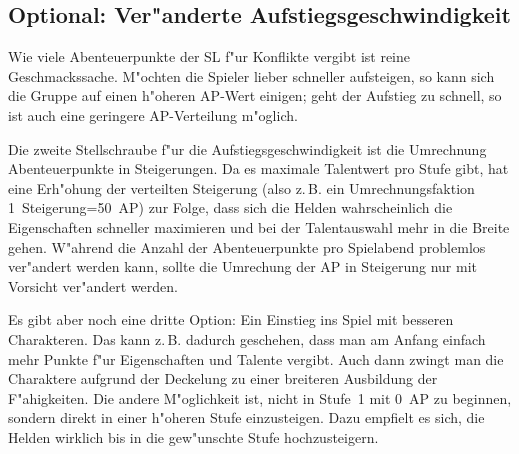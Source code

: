 \begin{optional}
\section{Optional: Ver"anderte Aufstiegsgeschwindigkeit}

Wie viele Abenteuerpunkte der SL f"ur Konflikte vergibt ist reine Geschmackssache. M"ochten die Spieler lieber schneller aufsteigen, so kann sich die Gruppe auf einen h"oheren AP-Wert einigen; geht der Aufstieg zu schnell, so ist auch eine geringere AP-Verteilung m"oglich.

Die zweite Stellschraube f"ur die Aufstiegsgeschwindigkeit ist die Umrechnung Abenteuerpunkte in Steigerungen. Da es maximale Talentwert pro Stufe gibt, hat eine Erh"ohung der verteilten Steigerung (also z.\,B. ein Umrechnungsfaktion 1~Steigerung=50~AP) zur Folge, dass sich die Helden wahrscheinlich die Eigenschaften schneller maximieren und bei der Talentauswahl mehr in die Breite gehen. W"ahrend die Anzahl der Abenteuerpunkte pro Spielabend problemlos ver"andert werden kann, sollte die Umrechung der AP in Steigerung nur mit Vorsicht ver"andert werden.

Es gibt aber noch eine dritte Option: Ein Einstieg ins Spiel mit besseren Charakteren. Das kann z.\,B. dadurch geschehen, dass man am Anfang einfach mehr Punkte f"ur Eigenschaften und Talente vergibt. Auch dann zwingt man die Charaktere aufgrund der Deckelung zu einer breiteren Ausbildung der F"ahigkeiten. Die andere M"oglichkeit ist, nicht in Stufe~1 mit 0~AP zu beginnen, sondern direkt in einer h"oheren Stufe einzusteigen. Dazu empfielt es sich, die Helden wirklich bis in die gew"unschte Stufe hochzusteigern.
\end{optional}

\label{EndeSpielregeln}



